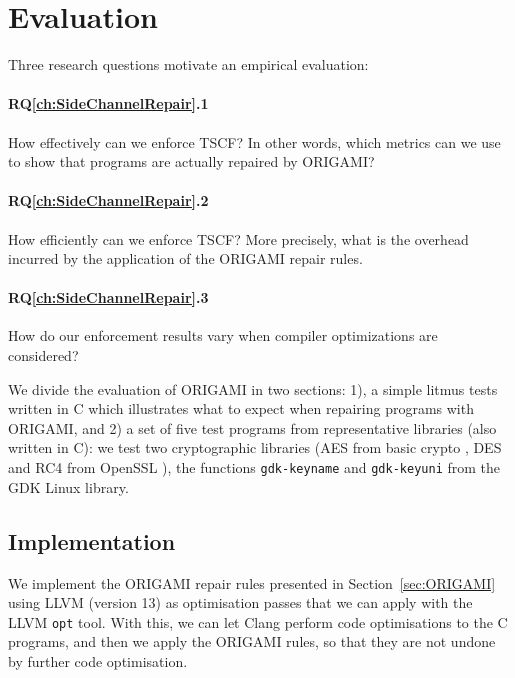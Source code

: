 \section{Evaluation}
\label{sec:Evaluation}
Three research questions motivate an empirical evaluation:
\paragraph*{RQ\ref{ch:SideChannelRepair}.1} How effectively can we enforce TSCF? In other words, which metrics can we use to show that programs are actually repaired by ORIGAMI?
\paragraph*{RQ\ref{ch:SideChannelRepair}.2} How efficiently can we enforce TSCF? More precisely, what is the overhead incurred by the application of the ORIGAMI repair rules.
\paragraph*{RQ\ref{ch:SideChannelRepair}.3} How do our enforcement results vary when compiler optimizations are considered? 
%

We divide the evaluation of ORIGAMI in two sections: 1), a simple litmus tests written in C which illustrates what to expect when repairing programs with ORIGAMI, and 2) a set of five test programs from representative libraries (also written in C): we test two cryptographic libraries (AES from basic crypto \cite{AESBasic}, DES and RC4 from OpenSSL \cite{OpenSSL}), the functions \texttt{gdk-keyname} and \texttt{gdk-keyuni} from the GDK Linux library.%

\subsection{Implementation}
\label{sec:Tool} 
We implement the ORIGAMI repair rules presented in Section~\ref{sec:ORIGAMI} using LLVM (version 13) as optimisation passes that we can apply with the LLVM \texttt{opt} tool. With this, we can let Clang perform code optimisations to the C programs, and then we apply the ORIGAMI rules, so that they are not undone by further code optimisation. 

